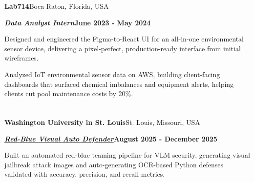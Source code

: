 \documentclass[10pt, letterpaper]{article}
\renewenvironment{leadershipentry}[2]{%
    \vspace{\entrySpacing}
    \needspace{4\baselineskip}%
    \noindent\textbf{#1}\hfill #2\par
}{}
\renewenvironment{positionentry}[2]{%
    \vspace{\highlightSpacing}
    \noindent\textbf{\textit{#1}}\hfill \textbf{#2}\par
    \vspace{\highlightSpacing}
    \begin{highlightsforbulletentries}
}{%
    \end{highlightsforbulletentries}
}
\begin{document}
\vspace{\entrySpacing}
\begin{leadershipentry}{Lab714}{Boca Raton, Florida, USA}
	\begin{positionentry}{Data Analyst Intern}{June 2023 - May 2024}
		\item Designed and engineered the Figma-to-React UI for an all-in-one environmental sensor device, delivering a pixel-perfect, production-ready interface from initial wireframes.
		\item Analyzed IoT environmental sensor data on AWS, building client-facing dashboards that surfaced chemical imbalances and equipment alerts, helping clients cut pool maintenance costs by 20\%.
	\end{positionentry}
\end{leadershipentry}

\vspace{\headerSpacing}


\section{}

\vspace{\entrySpacing}
\begin{leadershipentry}{Washington University in St. Louis}{St. Louis, Missouri, USA}
	\begin{positionentry}{\href{https://github.com/agopalareddy/visual-jailbreak-defense}{Red-Blue Visual Auto Defender}}{August 2025 - December 2025}
		\item Built an automated red-blue teaming pipeline for VLM security, generating visual jailbreak attack images and auto-generating OCR-based Python defenses validated with accuracy, precision, and recall metrics.
	\end{positionentry}
\end{leadershipentry}

\vspace{\headerSpacing}

\end{document}
